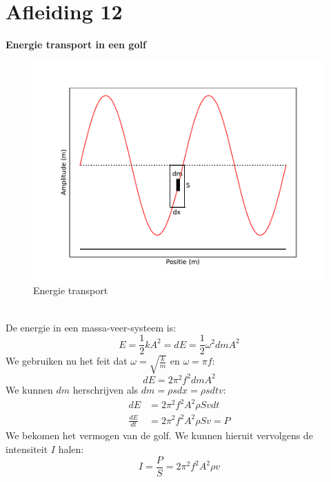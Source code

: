 \documentclass[a4paper,kul]{kulakarticle} %
\begin{document}
\section{Afleiding 12}
\textbf{Energie transport in een golf}\\
\begin{figure}[h]
	\centering
	\includegraphics[width=0.7\linewidth]{EnergieGolf}
	\caption[Energie transport]{Energie transport}
	\label{fig:energietransport}
\end{figure}\\
De energie in een massa-veer-systeem is:
\begin{equation*}
	E = \frac{1}{2}kA^2 = dE = \frac{1}{2}\omega^2dmA^2
\end{equation*}
We gebruiken nu het feit dat $\omega = \sqrt{\frac{k}{m}} $ en $\omega = \pi f$:
\begin{equation*}
	dE = 2\pi^2f^2dmA^2
\end{equation*}
We kunnen $dm$ herschrijven als $dm = \rho sdx = \rho sdtv$:
\begin{align*}
	dE &= 2\pi^2f^2A^2\rho Svdt\\
	\frac{dE}{dt} &= 2\pi^2f^2A^2\rho Sv = P
\end{align*}
We bekomen het vermogen van de golf. We kunnen hieruit vervolgens de intensiteit $I$ halen:
\begin{equation*}
	I = \frac{P}{S} = 2\pi^2f^2A^2\rho v
\end{equation*}
\newpage
\end{document}
